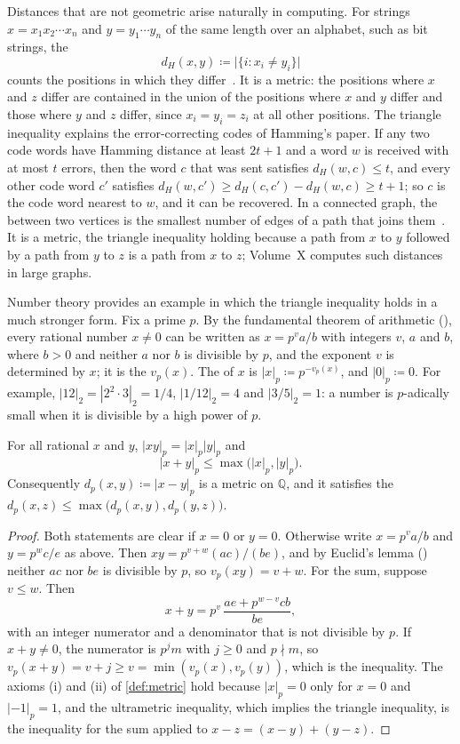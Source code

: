Distances that are not geometric arise naturally in computing. For strings $x=x_1x_2\cdots x_n$ and $y=y_1\cdots y_n$ of the same length over an alphabet, such as bit strings, the 
\[
d_H(x,y)\coloneqq\bigl|\{i: x_i\ne y_i\}\bigr|
\]
counts the positions in which they differ~\cite{hamming1950}. It is a metric: the positions where $x$ and $z$ differ are contained in the union of the positions where $x$ and $y$ differ and those where $y$ and $z$ differ, since $x_i=y_i=z_i$ at all other positions. The triangle inequality explains the error-correcting codes of Hamming's paper. If any two code words have Hamming distance at least $2t+1$ and a word $w$ is received with at most $t$ errors, then the word $c$ that was sent satisfies $d_H(w,c)\le t$, and every other code word $c'$ satisfies $d_H(w,c')\ge d_H(c,c')-d_H(w,c)\ge t+1$; so $c$ is the code word nearest to $w$, and it can be recovered. In a connected graph, the  between two vertices is the smallest number of edges of a path that joins them~\cite[Sect.~1.3]{diestel2017}. It is a metric, the triangle inequality holding because a path from $x$ to $y$ followed by a path from $y$ to $z$ is a path from $x$ to $z$; Volume~X computes such distances in large graphs.

Number theory provides an example in which the triangle inequality holds in a much stronger form. Fix a prime $p$. By the fundamental theorem of arithmetic (), every rational number $x\ne0$ can be written as $x=p^va/b$ with integers $v$, $a$ and $b$, where $b>0$ and neither $a$ nor $b$ is divisible by $p$, and the exponent $v$ is determined by $x$; it is the  $v_p(x)$. The  of $x$ is $|x|_p\coloneqq p^{-v_p(x)}$, and $|0|_p\coloneqq0$. For example, $|12|_2=|2^2\cdot3|_2=1/4$, $|1/12|_2=4$ and $|3/5|_2=1$: a number is $p$-adically small when it is divisible by a high power of $p$.

\begin{proposition}
\label{prop:p-adic}
For all rational $x$ and $y$, $|xy|_p=|x|_p|y|_p$ and
\[
|x+y|_p\le\max\bigl(|x|_p,|y|_p\bigr).
\]
Consequently $d_p(x,y)\coloneqq|x-y|_p$ is a metric on $\mathbb Q$, and it satisfies the  $d_p(x,z)\le\max\bigl(d_p(x,y),d_p(y,z)\bigr)$.
\end{proposition}

\begin{proof}
Both statements are clear if $x=0$ or $y=0$. Otherwise write $x=p^va/b$ and $y=p^wc/e$ as above. Then $xy=p^{v+w}(ac)/(be)$, and by Euclid's lemma () neither $ac$ nor $be$ is divisible by $p$, so $v_p(xy)=v+w$. For the sum, suppose $v\le w$. Then
\[
x+y=p^v\,\frac{ae+p^{w-v}cb}{be},
\]
with an integer numerator and a denominator that is not divisible by $p$. If $x+y\ne0$, the numerator is $p^jm$ with $j\ge0$ and $p\nmid m$, so $v_p(x+y)=v+j\ge v=\min(v_p(x),v_p(y))$, which is the inequality. The axioms (i) and (ii) of \cref{def:metric} hold because $|x|_p=0$ only for $x=0$ and $|-1|_p=1$, and the ultrametric inequality, which implies the triangle inequality, is the inequality for the sum applied to $x-z=(x-y)+(y-z)$.
\end{proof}

